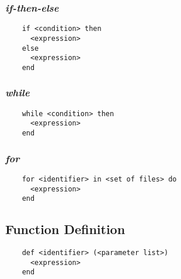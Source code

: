 \documentclass[11pt]{article}
\begin{document}
\subsubsection{\emph{if-then-else}}
\begin{listing}[H]
  \begin{verbatim}
    if <condition> then
      <expression>
    else
      <expression>
    end
  \end{verbatim}
  \label{lst:the-code}
\end{listing}

\subsubsection{\emph{while}}
\begin{listing}[H]
  \begin{verbatim}
    while <condition> then
      <expression>
    end
  \end{verbatim}
  \label{lst:the-code}
\end{listing}

\subsubsection{\emph{for}}
\begin{listing}[H]
  \begin{verbatim}
    for <identifier> in <set of files> do
      <expression>
    end
  \end{verbatim}
  \label{lst:the-code}
\end{listing}
\subsection{Function Definition}
\begin{listing}[H]
  \begin{verbatim}
    def <identifier> (<parameter list>)
      <expression>
    end
  \end{verbatim}
  \label{lst:the-code}
\end{listing}
\end{document}

